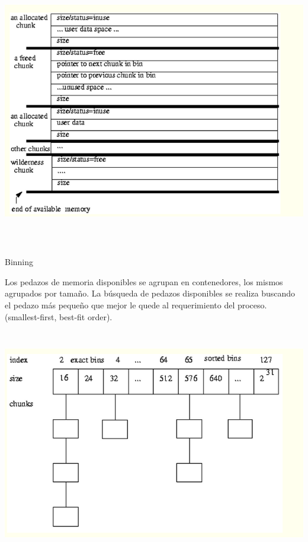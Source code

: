\documentclass[11pt]{article} %
\begin{document}
\includegraphics[height=12cm]{imagenes/boundary.png}

Binning

Los pedazos de memoria disponibles se agrupan en contenedores, los mismos agrupados por tamaño.  La búsqueda de pedazos disponibles se realiza buscando el pedazo más pequeño que mejor le quede al requerimiento del proceso. (smallest-first, best-fit order).



\includegraphics[height=10cm]{imagenes/binning.png}
\end{document}
